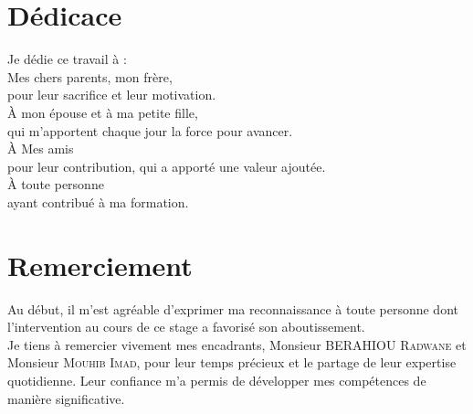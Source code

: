 \documentclass[12pt,a4paper]{report}
\begin{document}
	 
	
	
	\chapter*{Dédicace}
	
	
	\begin{center}
		\begin{minipage}{0.8\textwidth} %
			\centering
			\Large\itshape %
			
			Je dédie ce travail à :\\[1.5em] %
			
			Mes chers parents, mon frère,  \\
			pour leur sacrifice et leur motivation.\\[1em]
			
			À mon épouse et à ma petite fille,  \\
			qui m’apportent chaque jour la force pour avancer.\\[1em]
			
			À Mes amis \\
			pour leur contribution, qui a apporté une valeur ajoutée.\\[1em]
			
			À toute personne \\
			ayant contribué à ma formation.
			
		\end{minipage}
	\end{center}
	
	\clearpage
	\chapter*{Remerciement}
			
	Au début, il m'est agréable d'exprimer ma reconnaissance à toute personne dont l'intervention au cours de ce stage a favorisé son aboutissement.\\
			
	Je tiens à remercier vivement mes encadrants, Monsieur \textsc{BERAHIOU Radwane} et Monsieur \textsc{Mouhib Imad}, pour leur temps précieux et le partage de leur expertise quotidienne. Leur confiance m'a permis de développer mes compétences de manière significative.\\[0.6em]
				
\end{document}
